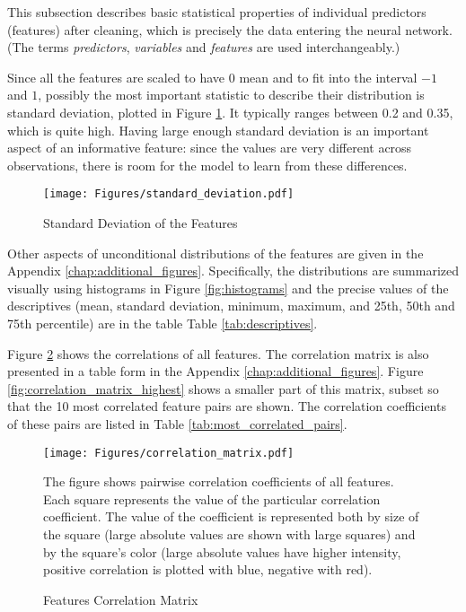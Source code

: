 		This subsection describes basic statistical properties of individual predictors (features) after cleaning, which is precisely the data entering the neural network. (The terms \textit{predictors}, \textit{variables} and \textit{features} are used interchangeably.) 
		 
		Since all the features are scaled to have 0 mean and to fit into the interval $-1$ and $1$, possibly the most important statistic to describe their distribution is standard deviation, plotted in Figure \ref{fig:standard_deviation}. It typically ranges between 0.2 and 0.35, which is quite high. Having large enough standard deviation is an important aspect of an informative feature: since the values are very different across observations, there is room for the model to learn from these differences.
		
		\begin{center}
			\begin{figure}
				\texttt{[image: Figures/standard\_deviation.pdf]}
				\caption{Standard Deviation of the Features}
				\label{fig:standard_deviation}
			\end{figure}
		\end{center}
		
		Other aspects of unconditional distributions of the features are given in the Appendix \ref{chap:additional_figures}. Specifically, the distributions are summarized visually using histograms in Figure \ref{fig:histograms} and the precise values of the descriptives (mean, standard deviation, minimum, maximum, and 25th, 50th and 75th percentile) are in the table Table \ref{tab:descriptives}.
	
			
		Figure \ref{fig:correlation_matrix} shows the correlations of all features. The correlation matrix is also presented in a table form in the Appendix \ref{chap:additional_figures}. Figure \ref{fig:correlation_matrix_highest} shows a smaller part of this matrix, subset so that the 10 most correlated feature pairs are shown. The correlation coefficients of these pairs are listed in Table \ref{tab:most_correlated_pairs}.
		
		\begin{center}
			\begin{figure}
				\texttt{[image: Figures/correlation\_matrix.pdf]}
				\caption{Features Correlation Matrix}
				\label{fig:correlation_matrix}
				\medskip
				\small 
				The figure shows pairwise correlation coefficients of all features. Each square represents the value of the particular correlation coefficient. The value of the coefficient is represented both by size of the square (large absolute values are shown with large squares) and by the square's color (large absolute values have higher intensity, positive correlation is plotted with blue, negative with red).
			\end{figure}
		\end{center}
	
